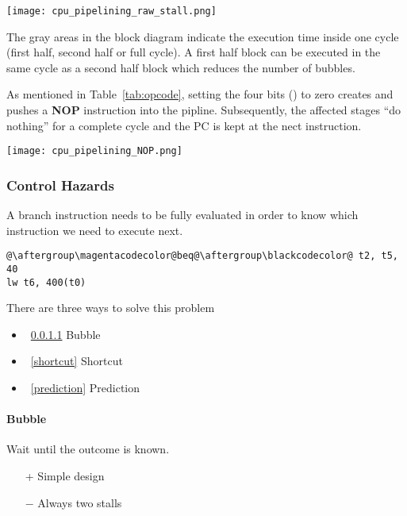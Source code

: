 \begin{multicols*}{2}
    \texttt{[image: cpu\_pipelining\_raw\_stall.png]}

    The gray areas in the block diagram indicate the execution time inside one cycle (first half, second half or full cycle). A first half block can be executed in the same cycle as a second half block which reduces the number of bubbles.

    As mentioned in Table~\ref{tab:opcode}, setting the four bits () to zero creates and pushes a \textbf{NOP} instruction into the pipline.
    Subsequently, the affected stages ``do nothing'' for a complete cycle and the PC is kept at the nect instruction.
    \begin{center}
        \texttt{[image: cpu\_pipelining\_NOP.png]}
    \end{center}

    \subsubsection{Control Hazards}\label{control hazards}

    A branch instruction needs to be fully evaluated in order to know which instruction we need to execute next.

    \begin{lstlisting}[escapechar=@]
@\aftergroup\magentacodecolor@beq@\aftergroup\blackcodecolor@ t2, t5, 40
lw t6, 400(t0)
\end{lstlisting}

    There are three ways to solve this problem
    \begin{itemize}
        \item~\ref{bubble} Bubble
        \item~\ref{shortcut} Shortcut
        \item~\ref{prediction} Prediction
    \end{itemize}

    \paragraph{Bubble}\label{bubble}

    Wait until the outcome is known.
    \begin{itemize}
        \item[+] Simple design
        \item[$-$] Always two stalls
    \end{itemize}


\end{multicols*}
